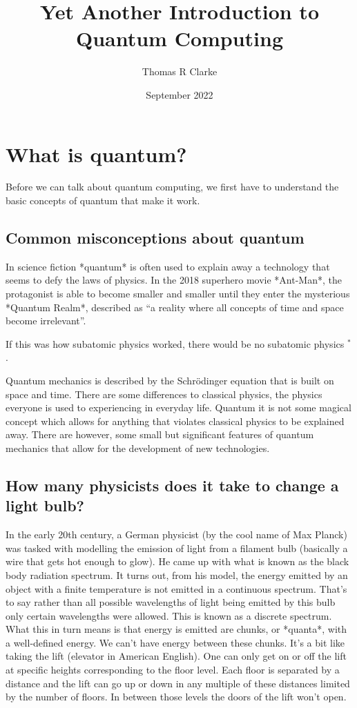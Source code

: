 \documentclass{book}
\title{Yet Another Introduction to Quantum Computing}
\author{Thomas R Clarke}
\date{September 2022}
\begin{document}
\maketitle
\tableofcontents

\section{What is quantum?}


Before we can talk about quantum computing, we first have to understand the basic concepts of quantum that make it work. 

\subsection{ Common misconceptions about quantum}
 
In science fiction *quantum* is often used to explain away a technology that seems to defy the laws of physics. In the 2018 superhero movie *Ant-Man*, the protagonist is able to become smaller and smaller until they enter the mysterious *Quantum Realm*, described as “a reality where all concepts of time and space become irrelevant”. 

If this was how subatomic physics worked, there would be no subatomic physics $^*$.

Quantum mechanics is described by the Schrödinger equation that is built on space and time. There are some differences to classical physics, the physics everyone is used to experiencing in everyday life. Quantum it is not some magical concept which allows for anything that violates classical physics to be explained away. There are however, some small but significant features of quantum mechanics that allow for the development of new technologies. 


\subsection{ How many physicists does it take to change a light bulb?}

In the early 20th century, a German physicist (by the cool name of Max Planck) was tasked with modelling the emission of light from a filament bulb (basically a wire that gets hot enough to glow). He came up with what is known as the black body radiation spectrum. It turns out, from his model, the energy emitted by an object with a finite temperature is not emitted in a continuous spectrum. That's to say rather than all possible wavelengths of light being emitted by this bulb only certain wavelengths were allowed. This is known as a discrete spectrum. What this in turn means is that energy is emitted are chunks, or *quanta*, with a well-defined energy. We can't have energy between these chunks. It's a bit like taking the lift (elevator in American English). One can only get on or off the lift at specific heights corresponding to the floor level. Each floor is separated by a distance and the lift can go up or down in any multiple of these distances limited by the number of floors. In between those levels the doors of the lift won't open.
\end{document}
